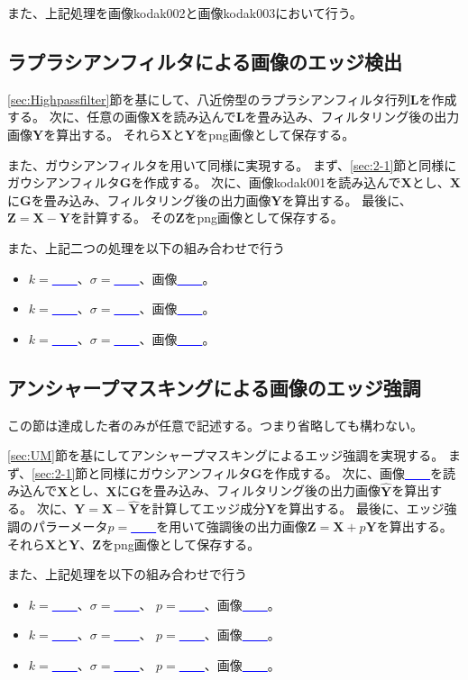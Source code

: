 \documentclass[11pt,a4paper]{jsarticle}
\newcommand{\rainn}{\textcolor{blue}{\uline{\ \ \ \ }}}
\newcommand{\sizi}[1]{\textcolor{OliveGreen}{\lbrack #1\rbrack}}
\begin{document}
また、上記処理を画像kodak002と画像kodak003において行う。


\subsection{ラプラシアンフィルタによる画像のエッジ検出}\label{sec:2-4}
\ref{sec:Highpassfilter}節を基にして、八近傍型のラプラシアンフィルタ行列$\mathbf{L}$を作成する。
次に、任意の画像$\mathbf{X}$を読み込んで$\mathbf{L}$を畳み込み、フィルタリング後の出力画像$\mathbf{Y}$を算出する。
それら$\mathbf{X}$と$\mathbf{Y}$をpng画像として保存する。

また、ガウシアンフィルタを用いて同様に実現する。
まず、\ref{sec:2-1}節と同様にガウシアンフィルタ$\mathbf{G}$を作成する。
次に、画像kodak001を読み込んで$\mathbf{X}$とし、$\mathbf{X}$に$\mathbf{G}$を畳み込み、フィルタリング後の出力画像$\mathbf{Y}$を算出する。
最後に、$\mathbf{Z}=\mathbf{X}-\mathbf{Y}$を計算する。
その$\mathbf{Z}$をpng画像として保存する。

また、上記二つの処理を以下の組み合わせで行う
\begin{itemize}
	\item
	$k=$\rainn{}、$\sigma=$\rainn{}、画像\rainn{}。
	\item 
	$k=$\rainn{}、$\sigma=$\rainn{}、画像\rainn{}。
	\item
	$k=$\rainn{}、$\sigma=$\rainn{}、画像\rainn{}。
\end{itemize}

\subsection{アンシャープマスキングによる画像のエッジ強調}\label{sec:2-5}
\noindent
\sizi{この節は達成した者のみが任意で記述する。つまり省略しても構わない。}

\ref{sec:UM}節を基にしてアンシャープマスキングによるエッジ強調を実現する。
まず、\ref{sec:2-1}節と同様にガウシアンフィルタ$\mathbf{G}$を作成する。
次に、画像\rainn{}を読み込んで$\mathbf{X}$とし、$\mathbf{X}$に$\mathbf{G}$を畳み込み、フィルタリング後の出力画像$\hat{\mathbf{Y}}$を算出する。
次に、$\mathbf{Y}=\mathbf{X}-\hat{\mathbf{Y}}$を計算してエッジ成分$\mathbf{Y}$を算出する。
最後に、エッジ強調のパラーメータ$p=$\rainn{}を用いて強調後の出力画像$\mathbf{Z}=\mathbf{X}+p\mathbf{Y}$を算出する。
それら$\mathbf{X}$と$\mathbf{Y}$、$\mathbf{Z}$をpng画像として保存する。

また、上記処理を以下の組み合わせで行う
\begin{itemize}
	\item
	$k=$\rainn{}、$\sigma=$\rainn{}、
	$p=$\rainn{}、画像\rainn{}。
	\item 
	$k=$\rainn{}、$\sigma=$\rainn{}、
	$p=$\rainn{}、画像\rainn{}。
	\item
	$k=$\rainn{}、$\sigma=$\rainn{}、
	$p=$\rainn{}、画像\rainn{}。
\end{itemize}
\end{document}
